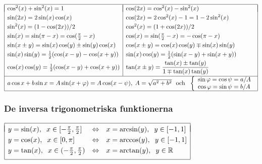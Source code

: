 \documentclass{article}
\begin{document}
\medskip
$\begin{array}{|l|l|}\hline &\\*[-11pt] %
 \cos^2(x)+\sin^2(x)=1  &
 \cos(2x)=\cos^2(x)-\sin^2(x) \EndRow %
 \sin(2x)=2\sin(x)\cos(x)&\cos(2x)=2\cos^2(x)-1=1-2\sin^2(x) \EndRow
 \sin^2(x) = (1-\cos(2x))/2 &
 \cos^2(x) = (1+\cos(2x))/2 \EndRow %
 \sin(x)=\sin(\pi-x)=\cos(\frac{\pi}{2}-x) &
 \cos(x)=\sin(\frac{\pi}{2}-x)=-\cos(\pi-x)\EndRow
 \sin(x\pm y)=\sin(x)\cos(y)\pm\sin(y)\cos(x) &
 \cos(x\pm y)=\cos(x)\cos(y)\mp\sin(x)\sin(y)\EndRow
 \sin(x)\sin(y)=\frac{1}{2}(\cos(x-y)-\cos(x+y)) &
 \sin(x)\cos(y)=\frac{1}{2}(\sin(x-y)+\sin(x+y)) \EndRow
 \cos(x)\cos(y)=\frac{1}{2}(\cos(x-y)+\cos(x+y)) &
 \tan(x\pm y)=\dfrac{\tan(x)\pm\tan(y)}{1\mp\tan(x)\tan(y)}\\*[8pt]
 \cline{1-2}\multicolumn{2}{|c|}{     %
   a\cos x+b\sin x=A\sin(x+\varphi) = A\cos(x-\psi),\;
              A=\sqrt{a^2+b^2}
     \mbox{ \ och \ }
              \left\{ \begin{array}{l}
              \sin\varphi=\cos\psi=a/A \\
              \cos\varphi=\sin\psi=b/A
\end{array}\right.}
 \EndRow\hline\end{array}$ %


\subsubsection*{De inversa trigonometriska funktionerna}%

$\begin{array}{|lll|}\hline && \\*[-9pt] 
  y=\sin(x),\hspace{2 mm} x\in[-\frac{\pi}{2},\frac{\pi}{2}]&
  \iff &
  x=\arcsin(y),\hspace{2 mm} y\in[-1,1] \EndRow 
  y=\cos(x),\hspace{2 mm} x\in[0,\pi]&
  \iff &
  x=\arccos(y),\hspace{2 mm} y\in[-1,1] \EndRow 
  y=\tan(x),\hspace{2 mm} x\in(-\frac{\pi}{2},\frac{\pi}{2})&
  \iff &
  x=\arctan(y), \hspace{2 mm} y\in\mathbb{R}\\*[6pt]\hline
\end{array}$  
\end{document}
